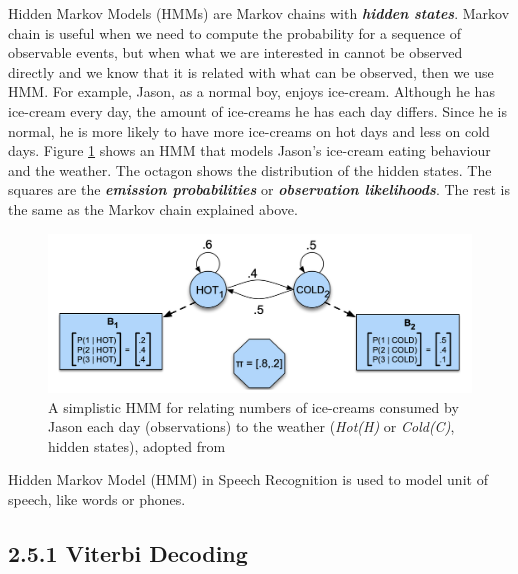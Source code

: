 \documentclass[nobib]{tufte-handout}
\begin{document}
Hidden Markov Models (HMMs) are Markov chains with \textbf{\textit{hidden states}}. Markov chain is useful when we need to compute the probability for a sequence of observable events, but when what we are interested in cannot be observed directly and we know that it is related with what can be observed, then we use HMM. For example, Jason, as a normal boy, enjoys ice-cream. Although he has ice-cream every day, the amount of ice-creams he has each day differs. Since he is normal, he is more likely to have more ice-creams on hot days and less on cold days. Figure \ref{fig:hmm} shows an HMM that models Jason's ice-cream eating behaviour and the weather. The octagon shows the distribution of the hidden states. The squares are the \textbf{\textit{emission probabilities}} or \textbf{\textit{observation likelihoods}}. The rest is the same as the Markov chain explained above.\\
\vspace{5em}
\begin{figure}
 \includegraphics[width=1\textwidth]{hmm.png}
  \caption{A simplistic HMM for relating numbers of ice-creams consumed by Jason each day (observations) to the weather (\textit{Hot(H)} or \textit{Cold(C)}, hidden states), adopted from \cite{slp}}
  \label{fig:hmm}
\end{figure}
Hidden Markov Model (HMM) in Speech Recognition is used to model unit of speech, like words or phones.

\subsection{2.5.1 \textbf{Viterbi Decoding}}
\end{document}
